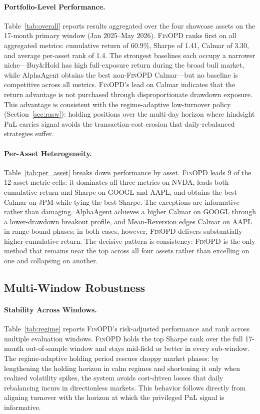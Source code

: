 \paragraph{Portfolio-Level Performance.} Table~\ref{tab:overall} reports results aggregated over the four showcase assets on the 17-month primary window (Jan 2025--May 2026). \textsc{FinOPD} ranks first on all aggregated metrics: cumulative return of 60.9\%, Sharpe of 1.41, Calmar of 3.30, and average per-asset rank of 1.4. The strongest baselines each occupy a narrower niche---Buy\&Hold has high full-exposure return during the broad bull market, while AlphaAgent obtains the best non-\textsc{FinOPD} Calmar---but no baseline is competitive across all metrics. \textsc{FinOPD}'s lead on Calmar indicates that the return advantage is not purchased through disproportionate drawdown exposure. This advantage is consistent with the regime-adaptive low-turnover policy (Section~\ref{sec:rasw}): holding positions over the multi-day horizon where hindsight PnL carries signal avoids the transaction-cost erosion that daily-rebalanced strategies suffer.



\paragraph{Per-Asset Heterogeneity.} Table~\ref{tab:per_asset} breaks down performance by asset. \textsc{FinOPD} leads 9 of the 12 asset-metric cells: it dominates all three metrics on NVDA, leads both cumulative return and Sharpe on GOOGL and AAPL, and obtains the best Calmar on JPM while tying the best Sharpe. The exceptions are informative rather than damaging. AlphaAgent achieves a higher Calmar on GOOGL through a lower-drawdown breakout profile, and Mean-Reversion edges Calmar on AAPL in range-bound phases; in both cases, however, \textsc{FinOPD} delivers substantially higher cumulative return. The decisive pattern is consistency: \textsc{FinOPD} is the only method that remains near the top across all four assets rather than excelling on one and collapsing on another.


\subsection{Multi-Window Robustness}



\paragraph{Stability Across Windows.} Table~\ref{tab:regime} reports \textsc{FinOPD}'s risk-adjusted performance and rank across multiple evaluation windows. \textsc{FinOPD} holds the top Sharpe rank over the full 17-month out-of-sample window and stays mid-field or better in every sub-window. The regime-adaptive holding period rescues choppy market phases: by lengthening the holding horizon in calm regimes and shortening it only when realized volatility spikes, the system avoids cost-driven losses that daily rebalancing incurs in directionless markets. This behavior follows directly from aligning turnover with the horizon at which the privileged PnL signal is informative.

